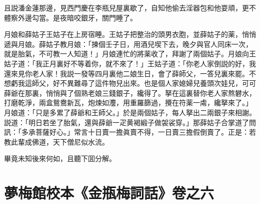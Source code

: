 且説潘金蓮那邊，見西門慶在李瓶兒屋裏歇了，自知他偷去淫器包和他耍頑，更不體察外邊勾當。是夜暗咬銀牙，關門睡了。

月娘和薛姑子王姑子在上房宿睡。王姑子把整治的頭男衣胞，並薛姑子的薬，悄悄遞與月娘。薛姑子教月娘：「揀個壬子日，用酒兒喫下去，晚夕與官人同床一次，就是胎氣，不可教一人知道！」月娘連忙的將薬收了，拜謝了兩個姑子。月娘向王姑子道：「我正月裏好不等着你，就不來了！」王姑子道：「你老人家倒説的好，我還來見你老人家！我説一發等四月裏他二娘生日，會了薛師父，一答兒裏來罷。不想虧我這師父，好不異難尋了這件物兒出來。也是個人家媳婦兒養頭次娃兒，可可薛爺在那裏，悄悄與了個熟老娘三錢銀子，纔得了。拏在這裏替你老人家熬礬水，打磨乾淨，兩盒鴛鴦新瓦，炮煉如灋，用重羅篩過，攪在符薬一䖏，纔拏來了。」月娘道：「只是多累了薛爺和王師父。」於是兩個姑子，每人拏出二兩銀子來相謝。説道：「明日若坐了胎氣，還與薛爺一疋黄褐緞子做袈裟穿。」那薛姑子合掌道了問訊：「多承菩薩好心。」常言十日賣一擔眞賣不得，一日賣三擔假倒賣了。正是：若教此輩成佛道，天下僧尼似水流。

畢竟未知後來何如，且聽下囬分解。

\part*{夢梅館校本《金瓶梅詞話》卷之六}

